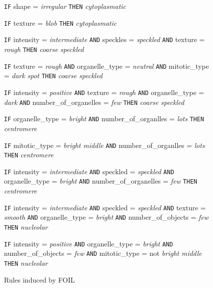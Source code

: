 \begin{figure}
	\caption{Rules induced by FOIL }
	\label{fig:RulesFOIL}
	\small
	\centering
	
		\begin{algorithmic}[1]
			\State \texttt{IF} shape = \textit{irregular} %
			\Statex \texttt{THEN} \textit{cytoplasmatic}
			
			\State \texttt{IF} texture = \textit{blob} %
			\Statex \texttt{THEN} \textit{cytoplasmatic}
			
			\State \texttt{IF} intensity = \textit{intermediate} \texttt{AND} speckles = \textit{speckled}  \texttt{AND} texture = \textit{rough}
			\Statex \texttt{THEN} \textit{coarse speckled}
			
			\State \texttt{IF} texture = \textit{rough} \texttt{AND} organelle\_type = \textit{neutral}  \texttt{AND} mitotic\_type = \textit{dark spot}
			\Statex \texttt{THEN} \textit{coarse speckled}
			
			\State \texttt{IF} intensity = \textit{positive} \texttt{AND} texture = \textit{rough}  \texttt{AND} organelle\_type = \textit{dark} \texttt{AND} number\_of\_organelles = \textit{few}
			\Statex \texttt{THEN} \textit{coarse speckled}
			
			\State \texttt{IF} organelle\_type = \textit{bright} \texttt{AND} number\_of\_organlles = \textit{lots}  
			\Statex \texttt{THEN} \textit{centromere}
			
			\State \texttt{IF} mitotic\_type = \textit{bright middle} \texttt{AND} number\_of\_organlles = \textit{lots}  
			\Statex \texttt{THEN} \textit{centromere}
			
			\State \texttt{IF} intensity = \textit{intermediate} \texttt{AND} speckled = \textit{speckled} \texttt{AND} organelle\_type = \textit{bright} \texttt{AND} number\_of\_organelles = \textit{few}
			\Statex \texttt{THEN} \textit{centromere}
			
			\State \texttt{IF} intensity = \textit{intermediate} \texttt{AND} speckled = \textit{speckled} \texttt{AND} texture = \textit{smooth} \texttt{AND} organelle\_type = \textit{bright} \texttt{AND} number\_of\_objects = \textit{few}
			\Statex \texttt{THEN} \textit{nucleolar}
			
			\State \texttt{IF} intensity = \textit{positive} \texttt{AND} organelle\_type = \textit{bright} \texttt{AND} number\_of\_objects = \textit{few} \texttt{AND} mitotic\_type = not \textit{bright middle}
			\Statex \texttt{THEN} \textit{nucleolar}
			

\end{algorithmic}
\end{figure}
